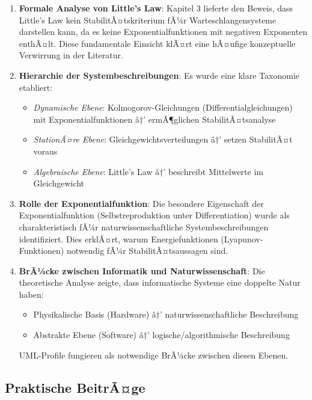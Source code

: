 ﻿\documentclass[a4paper,12pt]{report}
\theoremstyle{definition}
\begin{document}
\begin{enumerate}
	\item[-] \textbf{Formale Analyse von Little's Law}: Kapitel 3 lieferte den Beweis, dass Little's Law kein StabilitÃ¤tskriterium fÃ¼r Warteschlangensysteme darstellen kann, da es keine Exponentialfunktionen mit negativen Exponenten enthÃ¤lt. Diese fundamentale Einsicht klÃ¤rt eine hÃ¤ufige konzeptuelle Verwirrung in der Literatur.
	
	\item[-] \textbf{Hierarchie der Systembeschreibungen}: Es wurde eine klare Taxonomie etabliert:
	\begin{itemize}
		\item[-] \textit{Dynamische Ebene}: Kolmogorov-Gleichungen (Differentialgleichungen) mit Exponentialfunktionen â†’ ermÃ¶glichen StabilitÃ¤tsanalyse
		\item[-] \textit{StationÃ¤re Ebene}: Gleichgewichtsverteilungen â†’ setzen StabilitÃ¤t voraus
		\item[-] \textit{Algebraische Ebene}: Little's Law â†’ beschreibt Mittelwerte im Gleichgewicht
	\end{itemize}
	
	\item[-] \textbf{Rolle der Exponentialfunktion}: Die besondere Eigenschaft der Exponentialfunktion (Selbstreproduktion unter Differentiation) wurde als charakteristisch fÃ¼r naturwissenschaftliche Systembeschreibungen identifiziert. Dies erklÃ¤rt, warum Energiefunktionen (Lyapunov-Funktionen) notwendig fÃ¼r StabilitÃ¤tsaussagen sind.
	
	\item[-] \textbf{BrÃ¼cke zwischen Informatik und Naturwissenschaft}: Die theoretische Analyse zeigte, dass informatische Systeme eine doppelte Natur haben:
	\begin{itemize}
		\item[-] Physikalische Basis (Hardware) â†’ naturwissenschaftliche Beschreibung
		\item[-] Abstrakte Ebene (Software) â†’ logische/algorithmische Beschreibung
	\end{itemize}
	UML-Profile fungieren als notwendige BrÃ¼cke zwischen diesen Ebenen.
\end{enumerate}

\subsection{Praktische BeitrÃ¤ge}
\end{document}
